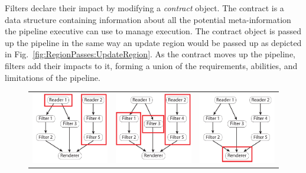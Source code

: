 \documentclass[journal,twocolumn,10pt,letterpaper,twoside]{IEEEtran}
\newcommand*{\figref}[1]{Fig.~\ref{#1}}
\newcommand*{\keyterm}[1]{\emph{#1}}
\begin{document}
Filters declare their impact by modifying a \keyterm{contract} object.  The
contract is a data structure containing information about all the potential
meta-information the pipeline executive can use to manage execution.  The
contract object is passed up the pipeline in the same way an update region
would be passed up as depicted in
\figref{fig:RegionPasses:UpdateRegion}.  As the contract moves up the
pipeline, filters add their impacts to it, forming a union of the
requirements, abilities, and limitations of the pipeline.

\begin{figure}[htbp]
  \centering
  \begin{tabular}{@{}c@{\qquad}c@{\qquad}c@{}}
    \includegraphics[scale=.9]{images/TaskParallel0} &
    \includegraphics[scale=.9]{images/TaskParallel1} &
    \includegraphics[scale=.9]{images/TaskParallel2} \\

\end{tabular}
\end{figure}
\end{document}
